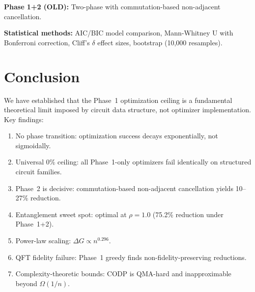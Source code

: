 \documentclass[aps,preprint,secnum,lined]{revtex4-2}
\begin{document}
\textbf{Phase 1+2 (OLD):} Two-phase with commutation-based non-adjacent cancellation.

\textbf{Statistical methods:} AIC/BIC model comparison, Mann-Whitney U with Bonferroni correction, Cliff's $\delta$ effect sizes, bootstrap (10,000 resamples).


\section{Conclusion}

We have established that the Phase~1 optimization ceiling is a fundamental theoretical limit imposed by circuit data structure, not optimizer implementation. Key findings:

\begin{enumerate}
\item No phase transition: optimization success decays exponentially, not sigmoidally.
\item Universal 0\% ceiling: all Phase~1-only optimizers fail identically on structured circuit families.
\item Phase~2 is decisive: commutation-based non-adjacent cancellation yields 10--27\% reduction.
\item Entanglement sweet spot: optimal at $\rho=1.0$ (75.2\% reduction under Phase~1+2).
\item Power-law scaling: $\Delta G \propto n^{0.296}$.
\item QFT fidelity failure: Phase~1 greedy finds non-fidelity-preserving reductions.
\item Complexity-theoretic bounds: CODP is QMA-hard and inapproximable beyond $\Omega(1/n)$.
\end{enumerate}

\end{document}
